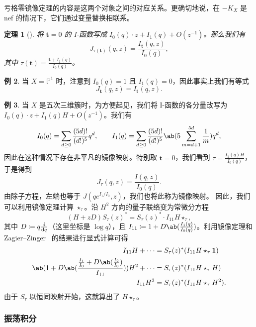 \documentclass{amsart}
\newtheorem{thm}{定理}[section]
\theoremstyle{definition}
\newtheorem{exm}[thm]{例}
\theoremstyle{remark}
\theoremstyle{plain}
\theoremstyle{definition}
\theoremstyle{remark}
\renewcommand{\P}{\mathbb{P}}
\newcommand{\mbf}[1]{\mathbf{#1}}
\newcommand{\1}{\mathbf{1}}
\newcommand{\2}{\mathbf{2}}
\newcommand{\3}{\mathbf{3}}
\begin{document}
亏格零镜像定理的内容是这两个对象之间的对应关系。更确切地说，在 \(-K_X\) 是 nef 的情况下，它们通过变量替换相联系。

\begin{thm}[{\cite{Givental1998,LLY1997}}]
    将 \(\mbf{t} = 0\) 的 I-函数写成 \(I_0(q) \cdot z + I_1(q) + O(z^{-1})\)。那么我们有
    \[
        J_{\tau(\mbf{t})}(q,z) = \frac{I_{\mbf{t}}(q,z)}{I_0(q)},
    \]
    其中 \(\tau(\mbf{t}) = \frac{\mbf{t} + I_1(q)}{I_0(q)}\)。
\end{thm}

\begin{exm}
    当 \(X = \P^1\) 时，注意到 \(I_0(q) = 1\) 且 \(I_1(q) = 0\)，因此事实上我们有等式
    \[ J_{\mbf{t}}(q,z) = I_{\mbf{t}}(q,z). \]
\end{exm}

\begin{exm}
    当 \(X\) 是五次三维簇时，为方便起见，我们将 I-函数的各分量改写为 \(I_0(q) \cdot z + I_1(q)H + O(z^{-1})\)。我们有
    \[ I_0(q) = \sum_{d \geq 0} \frac{(5d)!}{(d!)^5} q^d, \qquad I_1(q) = \sum_{d \geq 0} \frac{(5d)!}{(d!)^5} \ab(5\sum_{m=d+1}^{5d} \frac{1}{m}) q^d, \]
    因此在这种情况下存在非平凡的镜像映射。特别取 \(\mbf{t} = 0\)，我们看到 \(\tau = \frac{I_1(q)H}{I_0(q)}\)，于是得到
    \[ J_{\tau}(q,z) = \frac{I(q,z)}{I_0(q)}. \]
    由除子方程，左端也等于 \(J(qe^{I_1/I_0}, z)\)，我们也将此称为镜像映射。
    因此，我们可以利用镜像定理计算 $\star_{\tau}$。沿 \(H^2\) 方向的量子联络变为常微分方程
    \[ (H+zD) S_{\tau}(z)^* = S_{\tau}(z)^* \cdot I_{11} H \star_{\tau}, \]
    其中 $D \coloneqq q \odv{}{q}$（这里坐标是 $\log q$），且 $I_{11} \coloneqq 1 + D \ab(\frac{I_1(q)}{I_0(q)})$。利用镜像定理和 Zagier--Zinger~\cite{ZagierZinger2008} 的结果进行显式计算可得
    \begin{align*}
        I_{11} H + \cdots &= S_{\tau}(z)^* (I_{11} H \star_{\tau} \1) \\
        \ab( 1 + D\ab(\frac{\frac{I_1}{I_0} + D \ab(\frac{I_2}{I_0})}{I_{11}}) ) H^2 + \cdots &= S_{\tau}(z)^* (I_{11} H \star_{\tau} H) \\
        I_{11} H^3 &= S_{\tau}(z)^* (I_{11}H \star_{\tau} H^2).
    \end{align*}
    由于 $S_{\tau}$ 以恒同映射开始，这就算出了 $H \star_{\tau}$。
\end{exm}

\subsubsection{振荡积分}%
\label{ssub:Oscillating integrals}
\end{document}
